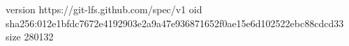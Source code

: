 version https://git-lfs.github.com/spec/v1
oid sha256:012e1bfdc7672e4192903e2a9a47e936871652f0ae15e6d102522ebc88cdcd33
size 280132
